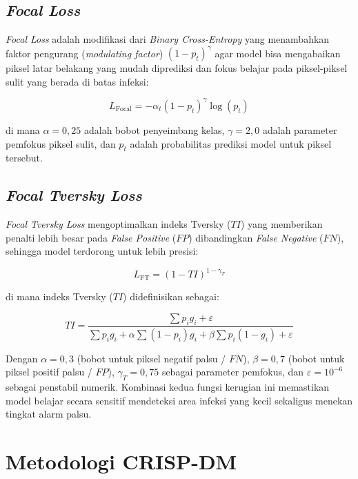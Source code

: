\documentclass[12pt,a4paper,oneside]{book}
\begin{document}
\subsection{\textit{Focal Loss}}

\textit{Focal Loss} adalah modifikasi dari \textit{Binary Cross-Entropy} yang menambahkan faktor pengurang (\textit{modulating factor}) $(1 - p_t)^\gamma$ agar model bisa mengabaikan piksel latar belakang yang mudah diprediksi dan fokus belajar pada piksel-piksel sulit yang berada di batas infeksi:

\begin{equation}
  L_{\text{Focal}} = -\alpha_t (1 - p_t)^\gamma \log(p_t)
\end{equation}

di mana $\alpha = 0{,}25$ adalah bobot penyeimbang kelas, $\gamma = 2{,}0$ adalah parameter pemfokus piksel sulit, dan $p_t$ adalah probabilitas prediksi model untuk piksel tersebut.

\subsection{\textit{Focal Tversky Loss}}

\textit{Focal Tversky Loss} mengoptimalkan indeks Tversky ($TI$) yang memberikan penalti lebih besar pada \textit{False Positive} ($FP$) dibandingkan \textit{False Negative} ($FN$), sehingga model terdorong untuk lebih presisi:

\begin{equation}
  L_{\text{FT}} = (1 - TI)^{1 - \gamma_T}
\end{equation}

di mana indeks Tversky ($TI$) didefinisikan sebagai:

\begin{equation}
  TI = \frac{\sum p_i g_i + \varepsilon}{\sum p_i g_i + \alpha \sum (1 - p_i)g_i + \beta \sum p_i(1 - g_i) + \varepsilon}
\end{equation}

Dengan $\alpha = 0{,}3$ (bobot untuk piksel negatif palsu / $FN$), $\beta = 0{,}7$ (bobot untuk piksel positif palsu / $FP$), $\gamma_T = 0{,}75$ sebagai parameter pemfokus, dan $\varepsilon = 10^{-6}$ sebagai penstabil numerik. Kombinasi kedua fungsi kerugian ini memastikan model belajar secara sensitif mendeteksi area infeksi yang kecil sekaligus menekan tingkat alarm palsu.

\section{Metodologi CRISP-DM}
\end{document}
